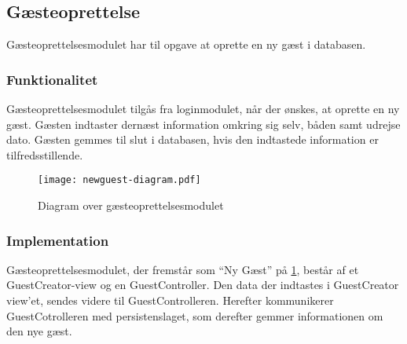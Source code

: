 \subsection{Gæsteoprettelse}
\label{sub:GuestCreator}

Gæsteoprettelsesmodulet har til opgave at oprette en ny gæst i databasen.

\subsubsection{Funktionalitet}
\label{ssub:GuestCreator_funktionalitet}
Gæsteoprettelsesmodulet tilgås fra loginmodulet, når der ønskes, at oprette en ny gæst. Gæsten indtaster dernæst information omkring sig selv, båden samt udrejse dato. Gæsten gemmes til slut i databasen, hvis den indtastede information er tilfredsstillende.

\begin{figure}
  \centering
  \texttt{[image: newguest-diagram.pdf]}
  \caption{Diagram over gæsteoprettelsesmodulet}
  \label{fig:guestcreator}
\end{figure}

\subsubsection{Implementation}
\label{ssub:GuestCreator_implementation}

Gæsteoprettelsesmodulet, der fremstår som \enquote{Ny Gæst} på \cref{fig:guestcreator}, består af et GuestCreator-view og en GuestController. Den data der indtastes i GuestCreator view'et, sendes videre til GuestControlleren. Herefter kommunikerer GuestCotrolleren med persistenslaget, som derefter gemmer informationen om den nye gæst.